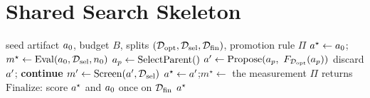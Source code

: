 \section{Shared Search Skeleton}
\label{app:skeleton}

\begin{algorithm}[h]
\caption{Shared search skeleton (hill-climb and agent-optimize).}
\label{alg:skeleton}
\begin{algorithmic}[1]
\REQUIRE seed artifact $a_0$, budget $B$, splits $(\mathcal{D}_{\mathrm{opt}},\mathcal{D}_{\mathrm{sel}},\mathcal{D}_{\mathrm{fin}})$, promotion rule $\Pi$
\STATE $a^\star\gets a_0$;\quad $m^\star\gets \mathrm{Eval}(a_0,\mathcal{D}_{\mathrm{sel}},n_0)$ 
  \STATE $a_p\gets \mathrm{SelectParent}()$ 
  \STATE $a'\gets \mathrm{Propose}(a_p,\ F_{\mathcal{D}_{\mathrm{opt}}}(a_p))$ 
     \STATE discard $a'$; \textbf{continue} 
  \ENDIF
  \STATE $m'\gets \mathrm{Screen}(a',\mathcal{D}_{\mathrm{sel}})$ 
     \STATE $a^\star\gets a'$;\quad $m^\star\gets$ the measurement $\Pi$ returns 
  \ENDIF
\ENDWHILE
\STATE $\mathrm{Finalize}$: score $a^\star$ and $a_0$ once on $\mathcal{D}_{\mathrm{fin}}$ 
\RETURN $a^\star$
\end{algorithmic}
\end{algorithm}

